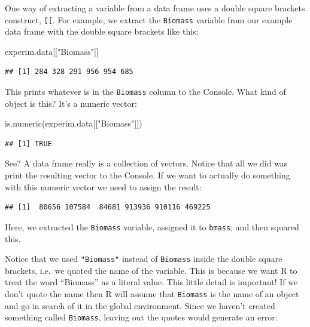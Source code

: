 \documentclass[
]{book}
\newenvironment{Shaded}{\begin{snugshade}}{\end{snugshade}}
\newcommand{\DecValTok}[1]{\textcolor[rgb]{0.00,0.00,0.81}{#1}}
\newcommand{\FunctionTok}[1]{\textcolor[rgb]{0.00,0.00,0.00}{#1}}
\newcommand{\NormalTok}[1]{#1}
\newcommand{\OtherTok}[1]{\textcolor[rgb]{0.56,0.35,0.01}{#1}}
\newcommand{\SpecialCharTok}[1]{\textcolor[rgb]{0.00,0.00,0.00}{#1}}
\newcommand{\StringTok}[1]{\textcolor[rgb]{0.31,0.60,0.02}{#1}}
\begin{document}
One way of extracting a variable from a data frame uses a double square brackets construct, \texttt{{[}{[}}. For example, we extract the \texttt{Biomass} variable from our example data frame with the double square brackets like this:

\begin{Shaded}
\begin{Highlighting}[]
\NormalTok{experim.data[[}\StringTok{"Biomass"}\NormalTok{]]}
\end{Highlighting}
\end{Shaded}

\begin{verbatim}
## [1] 284 328 291 956 954 685
\end{verbatim}

This prints whatever is in the \texttt{Biomass} column to the Console. What kind of object is this? It's a numeric vector:

\begin{Shaded}
\begin{Highlighting}[]
\FunctionTok{is.numeric}\NormalTok{(experim.data[[}\StringTok{"Biomass"}\NormalTok{]])}
\end{Highlighting}
\end{Shaded}

\begin{verbatim}
## [1] TRUE
\end{verbatim}

See? A data frame really is a collection of vectors. Notice that all we did was print the resulting vector to the Console. If we want to actually do something with this numeric vector we need to assign the result:

\begin{Shaded}
\end{Shaded}

\begin{verbatim}
## [1]  80656 107584  84681 913936 910116 469225
\end{verbatim}

Here, we extracted the \texttt{Biomass} variable, assigned it to \texttt{bmass}, and then squared this.

Notice that we used \texttt{"Biomass"} instead of \texttt{Biomass} inside the double square brackets, i.e.~we quoted the name of the variable. This is because we want R to treat the word ``Biomass'' as a literal value. This little detail is important! If we don't quote the name then R will assume that \texttt{Biomass} is the name of an object and go in search of it in the global environment. Since we haven't created something called \texttt{Biomass}, leaving out the quotes would generate an error:
\end{document}

